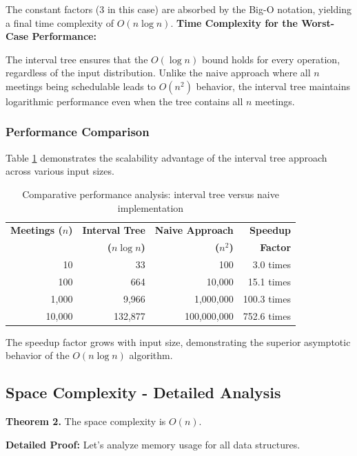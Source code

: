 \documentclass[conference]{IEEEtran}
\begin{document}
The constant factors (3 in this case) are absorbed by the Big-O notation, yielding a final time complexity of $O(n \log n)$.
\newline
\textbf{Time Complexity for the Worst-Case Performance:}

The interval tree ensures that the $O(\log n)$ bound holds for every operation, regardless of the input distribution. Unlike the naive approach where all $n$ meetings being schedulable leads to $O(n^2)$ behavior, the interval tree maintains logarithmic performance even when the tree contains all $n$ meetings.
\newline
\subsubsection{Performance Comparison}

Table \ref{tab:complexity_comparison} demonstrates the scalability advantage of the interval tree approach across various input sizes.

\begin{table}[h]
\centering
\begin{tabular}{r|r|r|r}
\toprule
\textbf{Meetings ($n$)} & \textbf{Interval Tree} & \textbf{Naive Approach} & \textbf{Speedup} \\
 & \textbf{($n \log n$)} & \textbf{($n^2$)} & \textbf{Factor} \\
\midrule
10 & 33 & 100 & 3.0 times \\
100 & 664 & 10,000 & 15.1 times \\
1,000 & 9,966 & 1,000,000 & 100.3 times \\
10,000 & 132,877 & 100,000,000 & 752.6 times \\
\bottomrule
\end{tabular}
\newline
\caption{Comparative performance analysis: interval tree versus naive implementation}
\label{tab:complexity_comparison}
\end{table}

The speedup factor grows with input size, demonstrating the superior asymptotic behavior of the $O(n \log n)$ algorithm.

\subsection{Space Complexity - Detailed Analysis}

\textbf{Theorem 2.} The space complexity is $O(n)$.

\textbf{Detailed Proof:} Let's analyze memory usage for all data structures.
\end{document}

